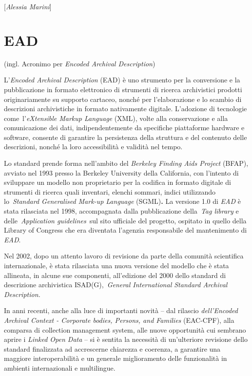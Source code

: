 {{\hrulefill 

{[}\emph{Alessia Marini}{]}


\chapter{EAD}

(ingl. Acronimo per \emph{Encoded Archival Description})

L'\emph{Encoded Archival Description} (EAD) è uno strumento per la
conversione e la pubblicazione in formato elettronico di strumenti di
ricerca archivistici prodotti originariamente su supporto cartaceo,
nonché per l'elaborazione e lo scambio di descrizioni archivistiche in
formato nativamente digitale. L'adozione di tecnologie
come~l'\emph{eXtensible Markup Language} (XML), volte alla conservazione
e alla comunicazione dei dati, indipendentemente da specifiche
piattaforme hardware e software, consente di garantire la persistenza
della struttura e del contenuto delle descrizioni, nonché la loro
accessibilità e validità nel tempo.

Lo standard prende forma nell'ambito del \emph{Berkeley Finding Aids
Project} (BFAP), avviato nel 1993 presso la Berkeley University della
California, con l'intento di sviluppare un modello non proprietario per
la codifica in formato digitale di strumenti di ricerca quali inventari,
elenchi sommari, indici utilizzando lo~\emph{Standard Generalised
Mark-up Language} (SGML)\textbf{.} La versione 1.0 di \emph{EAD} è stata
rilasciata nel 1998, accompagnata dalla pubblicazione della~\emph{Tag
library} e delle~\emph{Application guidelines}~sul sito ufficiale del
progetto, ospitato in quello della Library of Congress che era diventata
l'agenzia responsabile del mantenimento di \emph{EAD}.

Nel 2002, dopo un attento lavoro di revisione da parte della comunità
scientifica internazionale, è stata rilasciata una nuova versione del
modello che è stata allineata, in alcune sue componenti, all'edizione
del 2000 dello standard di descrizione archivistica
ISAD(G),~\emph{General International Standard Archival Description.}

In anni recenti, anche alla luce di importanti novità -- dal rilascio
\emph{dell'Encoded Archival Context - Corporate bodies, Persons, and
Families} (EAC-CPF), alla comparsa di collection management system, alle
nuove opportunità cui sembrano aprire i \emph{Linked Open Data} -- si è
sentita la necessità di un'ulteriore revisione dello standard
finalizzata ad accrescerne chiarezza e coerenza, a garantire una
maggiore interoperabilità e un generale miglioramento delle funzionalità
in ambienti internazionali e multilingue.

}}
